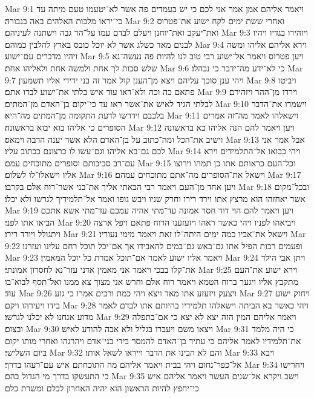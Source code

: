 Mar 9:1  ויאמר אליהם אמן אמר אני לכם כי יש בעמדים פה אשר לא־יטעמו טעם מיתה עד כי־יראו מלכות האלהים באה בגבורה׃
Mar 9:2  ואחרי ששת ימים לקח ישוע את־פטרוס ואת־יעקב ואת־יוחנן ויעלם לבדם עמו על־הר גבה וישתנה לעיניהם׃
Mar 9:3  ויזהירו בגדיו ויהיו לבנים מאד כשלג אשר לא יוכל כובס בארץ להלבין כמוהם׃
Mar 9:4  וירא אליהם אליהו ומשה ויהיו מדברים עם־ישוע׃
Mar 9:5  ויען פטרוס ויאמר אל־ישוע רבי טוב לנו להיות פה נעשה־נא שלש סכות לך אחת ולמשה אחת ולאליהו אחת׃
Mar 9:6  כי לא־ידע מה־ידבר כי נבהלו׃
Mar 9:7  ויהי ענן סוכך עליהם ויצא מן־הענן קול אמר זה בני ידידי אליו תשמעון׃
Mar 9:8  ויביטו פתאם כה וכה ולא־ראו עוד איש בלתי את־ישוע לבדו אתם׃
Mar 9:9  וירדו מן־ההר ויזהירם לבלתי הגיד לאיש את־אשר ראו עד כי־יקום בן־האדם מן־המתים׃
Mar 9:10  וישמרו את־הדבר בלבבם וידרשו לדעת התקומה מן־המתים מה־היא׃
Mar 9:11  וישאלהו לאמר מה־זה אמרים הסופרים כי אליהו בוא יבוא בראשונה׃
Mar 9:12  ויען ויאמר להם הנה אליהו בא בראשונה וישיב את־הכל ומה־כתוב על בן־האדם הלא אשר יענה הרבה וימאס׃
Mar 9:13  אבל אמר אני לכם גם־בא אליהו וגם־עשו לו כרצונם ככתוב עליו׃
Mar 9:14  ויהי כבואו אל־התלמידים וירא עם־רב סביבותם וסופרים מתוכחים עמם׃
Mar 9:15  וכל־העם כראותם אתו כן תמהו וירוצו אליו וישאלו־לו לשלום׃
Mar 9:16  וישאל את־הסופרים מה־אתם מתוכחים עמהם׃
Mar 9:17  ויען אחד מן־העם ויאמר רבי הבאתי אליך את־בני אשר־רוח אלם בקרבו׃
Mar 9:18  ובכל־מקום אשר יאחזהו הוא מרצץ אתו וירד רירו וחרק שניו ויבש גופו ואמר אל־תלמידיך לגרשו ולא יכלו׃
Mar 9:19  ויען ויאמר להם הוי דור חסר אמונה עד־מתי אהיה עמכם עד־מתי אשא אתכם הביאו אתו לפני׃
Mar 9:20  ויביאהו לפניו ויהי כאשר ראהו ויזעזענו הרוח פתאם ויפל ארצה ויתגולל ויורד רירו׃
Mar 9:21  וישאל את־אביו כמה ימים היתה־לו זאת ויאמר מימי נעוריו׃
Mar 9:22  ופעמים רבות הפיל אתו גם־באש גם־במים להאבידו אך אם־יכל תוכל רחם עלינו ועזרנו׃
Mar 9:23  ויאמר אליו ישוע לאמר אם־תוכל אמרת כל יוכל המאמין׃
Mar 9:24  ויתן אבי הילד את־קלו בבכי ויאמר אני מאמין אדני עזר־נא לחסרון אמונתי׃
Mar 9:25  וירא ישוע את־העם מתקבץ אליו ויגער ברוח הטמא ויאמר רוח אלם וחרש אני מצוך צא ממנו ואל־תסף לבוא־בו עוד׃
Mar 9:26  ויצעק ויזעזע אתו מאד ויצא ויהי כמת ורבים אמרו כי גוע׃
Mar 9:27  ויחזק ישוע בידו ויעירהו ויקם׃
Mar 9:28  ויהי כאשר בא הביתה וישאלהו תלמידיו בהיותם אתו לבדם לאמר מדוע אנחנו לא יכלנו לגרשו׃
Mar 9:29  ויאמר אליהם המין הזה יצא לא יצא כי אם־בתפלה ובצום׃
Mar 9:30  ויצאו משם ויעברו בגליל ולא אבה להודע לאיש׃
Mar 9:31  כי היה מלמד את־תלמידיו לאמר אליהם כי עתיד בן־האדם להמסר בידי בני־אדם ויהרגהו ואחרי מותו יקום ביום השלישי׃
Mar 9:32  והם לא הבינו את הדבר וייראו לשאל אותו׃
Mar 9:33  ויבא אל־כפר־נחום ויהי בבית ויאמר אליהם מה התוכחתם איש עם־רעהו בדרך׃
Mar 9:34  ויחרישו כי התעשקו בדרך מי הגדול בהם׃
Mar 9:35  וישב ויקרא אל־שנים העשר ויאמר אליהם איש כי־יחפץ להיות הראשון הוא יהיה האחרון לכלם ומשרת כלם׃
